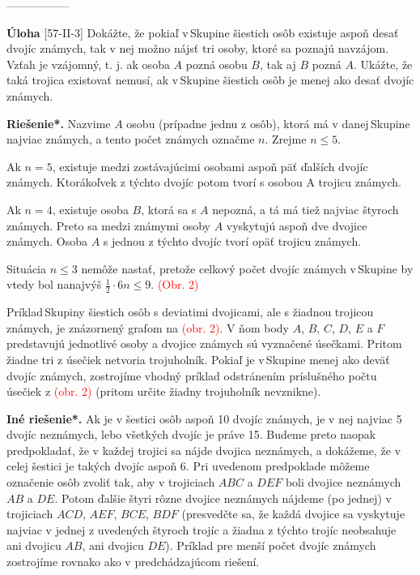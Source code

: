 \documentclass{article}
\newcommand{\rieh}{\textbf{Riešenie*.} }
\newcommand\todo[1]{\noindent\textcolor{red}{(#1)}}
\newcommand{\problem}[3]{
  \begin{tcolorbox}[breakable,notitle,boxrule=0pt,colback=light-gray,colframe=light-gray]
    \textbf{Úloha}
    [#1] #2
  \end{tcolorbox}
  \noindent#3
}
\begin{document}
-----------------

\problem{57-II-3}{
Dokážte, že pokiaľ v\,Skupine šiestich osôb existuje aspoň desať dvojíc známych, tak
v nej možno nájsť tri osoby, ktoré sa poznajú navzájom. Vzťah \uv{poznať sa} je vzájomný,
t. j. ak osoba $A$ pozná osobu $B$, tak aj $B$ pozná $A$. Ukážte, že taká trojica existovať
nemusí, ak v\,Skupine šiestich osôb je menej ako desať dvojíc známych.
}{
\rieh Nazvime $A$ osobu (prípadne jednu z osôb), ktorá má v danej\,Skupine najviac
známych, a tento počet známych označme $n$. Zrejme $n\leq 5$.

Ak $n = 5$, existuje medzi zostávajúcimi osobami aspoň päť ďalších dvojíc známych. Ktorákoľvek z týchto dvojíc potom tvorí s osobou A trojicu známych.

Ak $n = 4$, existuje osoba $B$, ktorá sa s $A$ nepozná, a tá má tiež najviac štyroch
známych. Preto sa medzi známymi osoby $A$ vyskytujú aspoň dve dvojice známych.
Osoba $A$ s jednou z týchto dvojíc tvorí opäť trojicu známych.

Situácia $n\leq 3$ nemôže nastať, pretože celkový počet dvojíc známych v\,Skupine by
vtedy bol nanajvýš $\frac{1}{2}\cdot 6n \leq 9$.
\todo{Obr. 2} 

Príklad\,Skupiny šiestich osôb s deviatimi dvojicami, ale s žiadnou trojicou známych,
je znázornený grafom na \todo{obr. 2}. V ňom body $A$, $B$, $C$, $D$, $E$ a $F$ predstavujú jednotlivé osoby a dvojice známych sú vyznačené úsečkami. Pritom žiadne tri z úsečiek netvoria
trojuholník. Pokiaľ je v\,Skupine menej ako deväť dvojíc známych, zostrojíme vhodný
príklad odstránením príslušného počtu úsečiek z \todo{obr. 2} (pritom určite žiadny trojuholník
nevznikne).

\textbf{Iné riešenie*.} Ak je v šestici osôb aspoň 10 dvojíc známych, je v nej najviac 5 dvojíc neznámych, lebo všetkých dvojíc je práve 15. Budeme preto naopak predpokladať, že v každej trojici sa nájde dvojica neznámych, a dokážeme, že v celej šestici je takých dvojíc aspoň 6. Pri uvedenom predpoklade môžeme označenie osôb zvoliť tak, aby v trojiciach $ABC$ a $DEF$ boli dvojice neznámych $AB$ a $DE$. Potom ďalšie štyri rôzne dvojice neznámych nájdeme (po jednej) v trojiciach $ACD$, $AEF$, $BCE$, $BDF$ (presvedčte sa, že každá dvojice sa vyskytuje najviac v jednej z uvedených štyroch trojíc a žiadna z týchto trojíc neobsahuje ani dvojicu $AB$, ani dvojicu $DE$). Príklad pre menší počet dvojíc známych zostrojíme rovnako ako v predchádzajúcom riešení.
}
\end{document}
